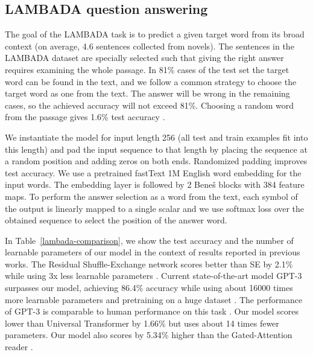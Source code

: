 \documentclass[letterpaper]{article} %
\begin{document}
\subsection{LAMBADA question answering}

The goal of the LAMBADA task is to predict a given target word from its broad context (on average, 4.6 sentences collected from novels). The sentences in the LAMBADA dataset \citep{Paperno2016TheLD} are specially selected such that giving the right answer requires examining the whole passage. In 81\% cases of the test set the target word can be found in the text, and we follow a common strategy \citep{Chu_2017, dehghani2018universal} to choose the target word as one from the text. The answer will be wrong in the remaining cases, so the achieved accuracy will not exceed 81\%. Choosing a random word from the passage gives 1.6\% test accuracy \citep{Paperno2016TheLD}.

We instantiate the model for input length 256 (all test and train examples fit into this length) and pad the input sequence to that length by placing the sequence at a random position and adding zeros on both ends. Randomized padding improves test accuracy. We use a pretrained fastText 1M English word embedding \citep{mikolov2018advances} for the input words. The embedding layer is followed by 2 Bene\v{s} blocks with 384 feature maps. To perform the answer selection as a word from the text, each symbol of the output is linearly mapped to a single scalar and we use softmax loss over the obtained sequence to select the position of the answer word.

In Table~\ref{lambada-comparison}, we show the test accuracy and the number of learnable parameters of our model in the context of results reported in previous works. The Residual Shuffle-Exchange network scores better than SE by 2.1\% while using 3x less learnable parameters \citep{shuffle-exchange}. Current state-of-the-art model GPT-3 surpasses our model, achieving 86.4\% accuracy while using about 16000 times more learnable parameters and pretraining on a huge dataset \cite{brown2020language}. The performance of GPT-3 is comparable to human performance on this task \citep{Chu_2017}. Our model scores lower than Universal Transformer by 1.66\% \citep{dehghani2018universal} but uses about 14 times fewer parameters. Our model also scores by 5.34\% higher than the Gated-Attention reader \citep{Chu_2017}.
\end{document}
